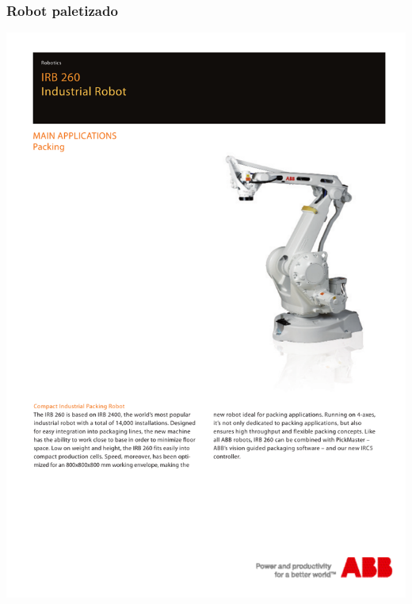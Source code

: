 \subsubsection{Robot paletizado}
\hspace*{-2cm}
\includegraphics[page=2]{Datasheets/IRB-260.pdf}
\newpage
